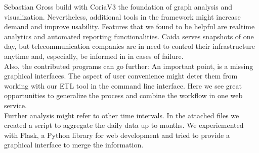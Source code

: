 \documentclass[conference, 11pt]{IEEEtran}
\begin{document}
Sebastian Gross build with CoriaV3 the foundation of graph analysis and visualization. Nevertheless, additional tools in the framework might increase demand and improve usability. Features that we found to be helpful are realtime analytics and automated reporting functionalities. Caida serves snapshots of one day, but telecommunication companies are in need to control their infrastructure anytime and, especially, be informed in in cases of failure. \\

Also, the contributed programs can go further: An important point, is a missing graphical interfaces. The aspect of user convenience might deter them from working with our ETL tool in the command line interface. Here we see great opportunities to generalize the process and combine the workflow in one web service.\\ \linebreak 
Further analysis might refer to other time intervals. In the attached files we created a script to aggregate the daily data up to months. 
We experiemented with Flask, a Python library for web development \cite{Flask} and tried to provide a graphical interface to merge the information.


\end{document}

